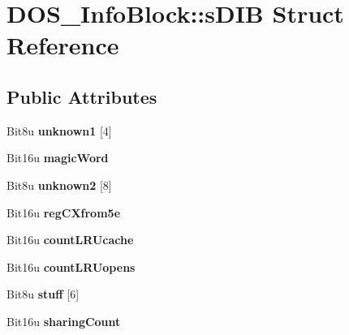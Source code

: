 \hypertarget{structDOS__InfoBlock_1_1sDIB}{\section{D\-O\-S\-\_\-\-Info\-Block\-:\-:s\-D\-I\-B Struct Reference}
\label{structDOS__InfoBlock_1_1sDIB}
}
\subsection*{Public Attributes}
\begin{DoxyCompactItemize}
\item 
\hypertarget{structDOS__InfoBlock_1_1sDIB_a68172daf1d309dc95ab0f92313d2fb2d}{Bit8u {\bfseries unknown1} \mbox{[}4\mbox{]}}\label{structDOS__InfoBlock_1_1sDIB_a68172daf1d309dc95ab0f92313d2fb2d}

\item 
\hypertarget{structDOS__InfoBlock_1_1sDIB_a62ed4a2b3fd93be1f51b192dadcef3da}{Bit16u {\bfseries magic\-Word}}\label{structDOS__InfoBlock_1_1sDIB_a62ed4a2b3fd93be1f51b192dadcef3da}

\item 
\hypertarget{structDOS__InfoBlock_1_1sDIB_a3b029c9afea8bae376c0c11162addc26}{Bit8u {\bfseries unknown2} \mbox{[}8\mbox{]}}\label{structDOS__InfoBlock_1_1sDIB_a3b029c9afea8bae376c0c11162addc26}

\item 
\hypertarget{structDOS__InfoBlock_1_1sDIB_a6ce47cefa7395e2d77fc4b6d8bc75cbc}{Bit16u {\bfseries reg\-C\-Xfrom5e}}\label{structDOS__InfoBlock_1_1sDIB_a6ce47cefa7395e2d77fc4b6d8bc75cbc}

\item 
\hypertarget{structDOS__InfoBlock_1_1sDIB_ae4f29c6f2d41c3d4080d51aa83f82279}{Bit16u {\bfseries count\-L\-R\-Ucache}}\label{structDOS__InfoBlock_1_1sDIB_ae4f29c6f2d41c3d4080d51aa83f82279}

\item 
\hypertarget{structDOS__InfoBlock_1_1sDIB_ace849192ab7971cfc2003b37f54d5430}{Bit16u {\bfseries count\-L\-R\-Uopens}}\label{structDOS__InfoBlock_1_1sDIB_ace849192ab7971cfc2003b37f54d5430}

\item 
\hypertarget{structDOS__InfoBlock_1_1sDIB_aca535e7353a415242df2e48c08afbdc5}{Bit8u {\bfseries stuff} \mbox{[}6\mbox{]}}\label{structDOS__InfoBlock_1_1sDIB_aca535e7353a415242df2e48c08afbdc5}

\item 
\hypertarget{structDOS__InfoBlock_1_1sDIB_a3333a10971605a6ded168dceff746d37}{Bit16u {\bfseries sharing\-Count}}\label{structDOS__InfoBlock_1_1sDIB_a3333a10971605a6ded168dceff746d37}


\end{DoxyCompactItemize}
